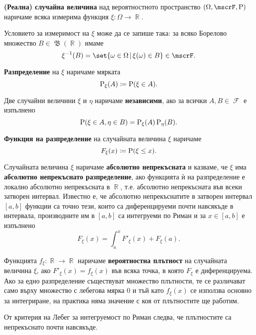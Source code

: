 \documentclass{../../common/topic}
\begin{document}
\begin{definition}
  \textbf{(Реална) случайна величина} над вероятностното пространство \( (\Omega, \mscrF, \Prob) \) наричаме всяка измерима функция \( \xi : \Omega \to \BbbR \).

  Условието за измеримост на \( \xi \) може да се запише така: за всяко Борелово множество \( B \in \mfrakB(\BbbR) \) имаме
  \begin{equation*}
    \xi^{-1} (B) = \set{ \omega \in \Omega \given \xi(\omega) \in B } \in \mscrF.
  \end{equation*}

  \textbf{Разпределение} на \( \xi \) наричаме мярката
  \begin{equation*}
    \operatorname{P}_\xi(A) \coloneqq \operatorname{P}(\xi \in A).
  \end{equation*}

  Две случайни величини \( \xi \) и \( \eta \) наричаме \textbf{независими}, ако за всички \( A, B \in \mscrF \) е изпълнено
  \begin{equation*}
    \operatorname{P}(\xi \in A, \eta \in B) = \operatorname{P}_\xi(A) \operatorname{P}_\eta(B).
  \end{equation*}

  \textbf{Функция на разпределение} на случайната величина \( \xi \) наричаме
  \begin{equation*}
    F_\xi(x) \coloneqq \operatorname{P}(\xi \leq x).
  \end{equation*}

  Случайната величина \( \xi \) наричаме \textbf{абсолютно непрекъсната} и казваме, че \( \xi \) има \textbf{абсолютно непрекъснато разпределение}, ако функцията ѝ на разпределение е локално абсолютно непрекъсната в \( \BbbR \), т.е. абсолютно непрекъсната във всеки затворен интервал. Известно е, че абсолютно непрекъснатите в затворен интервал \( [a, b] \) функции са точно тези, които са диференцируеми почти навсякъде в интервала, производните им в \( [a, b] \) са интегруеми по Риман и за \( x \in [a, b] \) е изпълнено
  \begin{equation*}
    F_\xi(x) = \int_a^x F'_\xi(x) + F_\xi(a).
  \end{equation*}

  Функцията \( f_\xi: \BbbR \to \BbbR \) наричаме \textbf{вероятностна плътност} на случайната величина \( \xi \), ако \( F'_\xi(x) = f_\xi(x) \) във всяка точка, в която \( F_\xi \) е диференцируема. Ако за едно разпределение съществуват множество плътности, те се различават само върху множество с лебегова мярка 0 и тъй като \( f_\xi(x) \) се използва основно за интегриране, на практика няма значение с коя от плътностите ще работим.

  От критерия на Лебег за интегруемост по Риман следва, че плътностите са непрекъснато почти навсякъде.
\end{definition}
\end{document}

